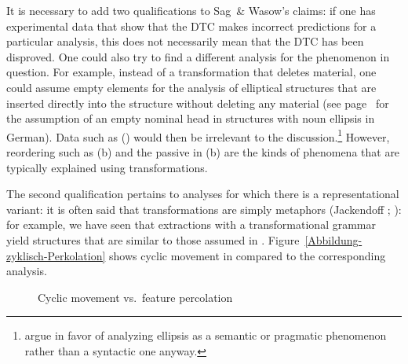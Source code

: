 It is necessary to add two qualifications to Sag~\& Wasow's claims: if one has experimental data that show that the DTC makes incorrect predictions for a particular
analysis, this does not necessarily mean that the DTC has been disproved. One could also try to find a different analysis for the phenomenon in question.
For example, instead of a transformation that deletes material, one could assume empty elements for the analysis of elliptical structures that are inserted
directly into the structure without deleting any material (see page~\pageref{np-epsilon} for the
assumption of an empty nominal head in structures with noun ellipsis in German). Data such as () would then be irrelevant to the discussion.\footnote{%
  \citet[Chapters~1 and~7]{CJ2005a} argue in favor of analyzing ellipsis as a semantic or pragmatic phenomenon rather than a syntactic
  one anyway.
} 
However, reordering such as (b) and the passive in (b) are the kinds of phenomena that are typically explained using transformations.

The second qualification pertains to analyses for which there is a representational variant: it is often said that transformations are simply
metaphors (Jackendoff \citeyear[--23]{Jackendoff2000a}; \citeyear[, 20]{Jackendoff2007a}): for example, we have seen that extractions with a transformational grammar yield structures that
are similar to those assumed in \hpsg. Figure~\vref{Abbildung-zyklisch-Perkolation} shows cyclic movement in \gbt compared
to the corresponding \hpsg analysis.
\begin{figure}
\hfill%
\hfill
{}
\hfill\mbox{}%
\caption{Cyclic movement vs.\ feature percolation}\label{Abbildung-zyklisch-Perkolation}
\end{figure}%

